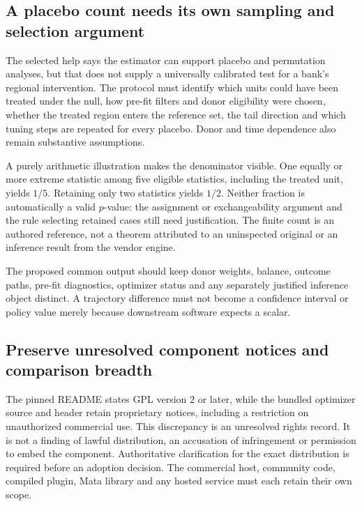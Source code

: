 \subsection{A placebo count needs its own sampling and selection argument}
\label{exec19:synth-inference}

The selected help says the estimator can support placebo and permutation
analyses, but that does not supply a universally calibrated test for a bank's
regional intervention. The protocol must identify which units could have been
treated under the null, how pre-fit filters and donor eligibility were chosen,
whether the treated region enters the reference set, the tail direction and
which tuning steps are repeated for every placebo. Donor and time dependence
also remain substantive assumptions.

A purely arithmetic illustration makes the denominator visible. One equally or
more extreme statistic among five eligible statistics, including the treated
unit, yields $1/5$. Retaining only two statistics yields $1/2$. Neither fraction
is automatically a valid $p$-value: the assignment or exchangeability argument
and the rule selecting retained cases still need justification. The finite count
is an authored reference, not a theorem attributed to an uninspected original
or an inference result from the vendor engine.~\citep{exec19_synth_contract_reference}

The proposed common output should keep donor weights, balance, outcome paths,
pre-fit diagnostics, optimizer status and any separately justified inference
object distinct. A trajectory difference must not become a confidence interval
or policy value merely because downstream software expects a scalar.

\subsection{Preserve unresolved component notices and comparison breadth}
\label{exec19:synth-rights}

The pinned README states GPL version 2 or later, while the bundled optimizer
source and header retain proprietary notices, including a restriction on
unauthorized commercial use. This discrepancy is an unresolved rights record.
It is not a finding of lawful distribution, an accusation of infringement or
permission to embed the component. Authoritative clarification for the exact
distribution is required before an adoption decision. The commercial host,
community code, compiled plugin, Mata library and any hosted service must each
retain their own scope.~\citep{exec19_synth_stata_source}

